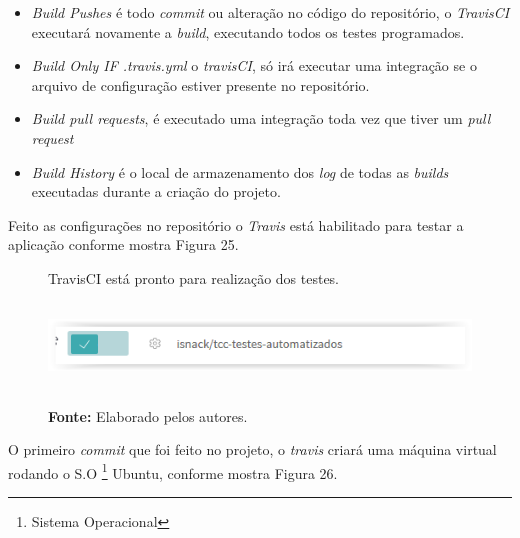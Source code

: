 \begin{itemize}
 
\item \textit{Build Pushes} é todo \textit{commit} ou alteração no código do repositório, o \textit{TravisCI} executará novamente a \textit{build}, executando todos os testes programados.

\item \textit{Build Only IF .travis.yml} o \textit{travisCI}, só irá executar uma integração se o arquivo de configuração estiver presente no repositório.
 
 \item \textit{Build pull requests}, é executado uma integração toda vez que tiver um \textit{pull request}
 
 \item \textit{Build History} é o local de armazenamento dos \textit{log} de todas as \textit{builds} executadas durante a criação do projeto.
 
\end{itemize}


\par Feito as configurações no repositório o \textit{Travis} está habilitado para testar a aplicação conforme mostra Figura 25.
\newpage
\begin{figure}[!htb]
    \caption[TravisCI está pronto para realização dos testes ]{TravisCI está pronto para realização dos testes.
     \centering
     \includegraphics[width=15cm,height=3cm]{imagens/travis6.png}
      \textbf{Fonte: } Elaborado pelos autores.}
     \label{fig:TravisCI está pronto para realização dos testes}
\end{figure}

\par O primeiro \textit{commit} que foi feito no projeto, o \textit{travis} criará uma máquina virtual rodando o S.O \footnote{Sistema Operacional} Ubuntu, conforme mostra Figura 26.


